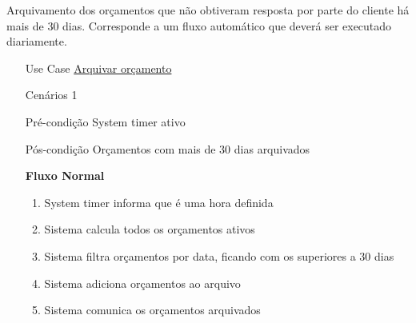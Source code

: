 \documentclass[../relatorio.tex]{subfiles}
\begin{document}
Arquivamento dos orçamentos que não obtiveram resposta por parte do cliente há mais de 30 dias.
Corresponde a um fluxo automático que deverá ser executado diariamente.
\begin{itemize}
    \item[Use Case] {\underline{Arquivar orçamento}}
    \item[Cenários] {1}
    \item[Pré-condição] {System timer ativo}
    \item[Pós-condição] {Orçamentos com mais de 30 dias arquivados}
          \begin{flushleft}
              \textbf{Fluxo Normal}
          \end{flushleft}
          \begin{enumerate}
              \item System timer informa que é uma hora definida
              \item Sistema calcula todos os orçamentos ativos
              \item Sistema filtra orçamentos por data, ficando com os superiores a 30 dias
              \item Sistema adiciona orçamentos ao arquivo
              \item Sistema comunica os orçamentos arquivados
          \end{enumerate}
\end{itemize}
\end{document}
